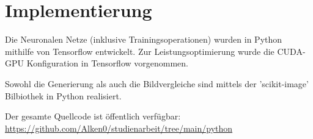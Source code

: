 \chapter{Implementierung}

Die Neuronalen Netze (inklusive Trainingsoperationen) wurden in Python mithilfe von Tensorflow \cite{tensorflow} entwickelt.
Zur Leistungsoptimierung wurde die CUDA-GPU Konfiguration in Tensorflow vorgenommen.
\newline

Sowohl die Generierung als auch die Bildvergleiche sind mittels der 'scikit-image' Bilbiothek in Python realisiert.
\newline

Der gesamte Quellcode ist öffentlich verfügbar:
\newline
\url{https://github.com/Alken0/studienarbeit/tree/main/python} 
